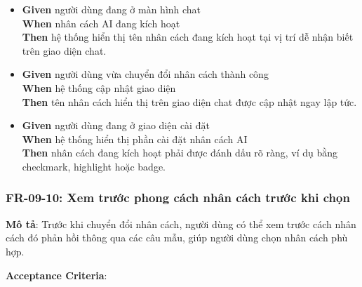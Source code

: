 \begin{itemize}
\item \textbf{Given} người dùng đang ở màn hình chat  \\ \hspace*{1.5em}  \textbf{When} nhân cách AI đang kích hoạt  \\ \hspace*{1.5em}  \textbf{Then} hệ thống hiển thị tên nhân cách đang kích hoạt tại vị trí dễ nhận biết trên giao diện chat.
\item \textbf{Given} người dùng vừa chuyển đổi nhân cách thành công  \\ \hspace*{1.5em}  \textbf{When} hệ thống cập nhật giao diện  \\ \hspace*{1.5em}  \textbf{Then} tên nhân cách hiển thị trên giao diện chat được cập nhật ngay lập tức.
\item \textbf{Given} người dùng đang ở giao diện cài đặt  \\ \hspace*{1.5em}  \textbf{When} hệ thống hiển thị phần cài đặt nhân cách AI  \\ \hspace*{1.5em}  \textbf{Then} nhân cách đang kích hoạt phải được đánh dấu rõ ràng, ví dụ bằng checkmark, highlight hoặc badge.
\end{itemize}
\subsubsection{FR-09-10: Xem trước phong cách nhân cách trước khi chọn}

\textbf{Mô tả}: Trước khi chuyển đổi nhân cách, người dùng có thể xem trước cách nhân cách đó phản hồi thông qua các câu mẫu, giúp người dùng chọn nhân cách phù hợp.



\textbf{Acceptance Criteria}:

